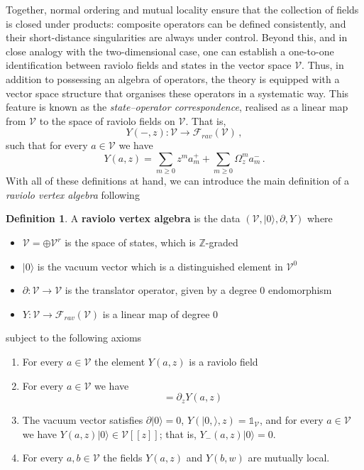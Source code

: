 \documentclass[11pt]{amsart}
\newcommand{\cF}{{\mathcal F}}
\newcommand{\CV}{{\mathcal V}}
\numberwithin{equation}{section}
\numberwithin{figure}{section}
\numberwithin{table}{section}
\theoremstyle{thm}
\numberwithin{equation}{subsection}
\theoremstyle{definition}
\newtheorem{dfn}[theorem]{Definition}
\theoremstyle{rem}
\begin{document}
Together, normal ordering and mutual locality ensure that the collection of fields is closed under products: composite operators can be defined consistently, and their short-distance singularities are always under control. Beyond this, and in close analogy with the two-dimensional case, one can establish a one-to-one identification between raviolo fields and states in the vector space $\mathcal V$. Thus, in addition to possessing an algebra of operators, the theory is equipped with a vector space structure that organises these operators in a systematic way. This feature is known as the \emph{state–operator correspondence}, realised as a linear map from $\mathcal V$ to the space of raviolo fields on $\mathcal V$. That is,
\begin{equation}
    Y(-,z):\CV\to \cF_{rav}(\CV)\,,
\end{equation}
such that for every $a\in \CV$ we have
\begin{equation}
    Y(a,z)=\sum_{m \geq 0} z^{m} a^+_m + \sum_{m\geq 0} \Omega_z^m a^-_m \,. 
\end{equation}
With all of these definitions at hand, we can introduce the main definition of a \emph{raviolo vertex algebra} following \cite{Garner:2023zqn}

\begin{dfn}
    A \textbf{raviolo vertex algebra} is the data $(\mathcal{V},|0\rangle,\partial,Y)$ where 
    \begin{itemize}
        \item $\CV = \oplus \CV^r$ is the space of states, which is $\mathbb{Z}$-graded
        \item $|0\rangle$ is the vacuum vector which is a distinguished element in $\CV^0$
        \item $\partial:\CV \to \CV$ is the translator operator, given by a degree $0$ endomorphism
        \item $Y:\CV \to \mathcal{F}_{rav}(\CV)$ is a linear map of degree $0$
    \end{itemize}
subject to the following axioms
\begin{enumerate}
    \item For every $a\in \CV$ the element $Y(a,z)$ is a raviolo field
    \item For every $a\in \CV$ we have
    \begin{equation*}
        [\partial,Y(a,z)]=\partial_zY(a,z)
    \end{equation*}
    \item The vacuum vector satisfies $\partial|0\rangle = 0$, $Y(|0,\rangle,z)=\mathbb{1}_{\CV}$, and for every $a\in \CV$ we have $Y(a,z)|0\rangle \in \mathcal{V}[\![z]\!]$; that is, $Y_-(a,z)|0\rangle = 0$. 
    \item For every $a,b \in \CV$ the fields $Y(a,z)$ and $Y(b,w)$ are mutually local. 
\end{enumerate}

\end{dfn}
\end{document}
